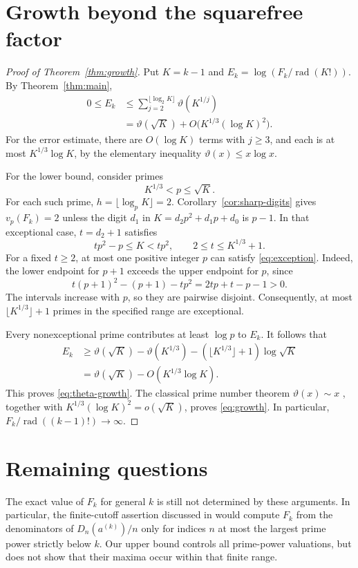 \documentclass[11pt]{article}
\theoremstyle{remark}
\DeclareMathOperator{\rad}{rad}
\begin{document}
\section{Growth beyond the squarefree factor}
\begin{proof}[Proof of Theorem~\ref{thm:growth}]
Put $K=k-1$ and $E_k=\log(F_k/\rad(K!))$. By Theorem~\ref{thm:main},
\begin{align*}
 0\leq E_k
 &\leq\sum_{j=2}^{\lfloor\log_2 K\rfloor}\vartheta(K^{1/j})\\
 &=\vartheta(\sqrt K)+O\bigl(K^{1/3}(\log K)^2\bigr).
\end{align*}
For the error estimate, there are $O(\log K)$ terms with $j\geq3$, and
each is at most $K^{1/3}\log K$, by the elementary inequality
$\vartheta(x)\leq x\log x$.

For the lower bound, consider primes
\[
 K^{1/3}<p\leq\sqrt K.
\]
For each such prime, $h=\lfloor\log_p K\rfloor=2$.
Corollary~\ref{cor:sharp-digits} gives $v_p(F_k)=2$ unless the digit
$d_1$ in $K=d_2p^2+d_1p+d_0$ is $p-1$.
In that exceptional case, $t=d_2+1$ satisfies
\begin{equation}\label{eq:exception}
 tp^2-p\leq K<tp^2,\qquad 2\leq t\leq K^{1/3}+1.
\end{equation}
For a fixed $t\geq2$, at most one positive integer $p$ can satisfy
\eqref{eq:exception}. Indeed, the lower endpoint for $p+1$ exceeds the
upper endpoint for $p$, since
\[
 t(p+1)^2-(p+1)-tp^2=2tp+t-p-1>0.
\]
The intervals increase with $p$, so they are pairwise disjoint.
Consequently, at most $\lfloor K^{1/3}\rfloor+1$ primes in the specified
range are exceptional.

Every nonexceptional prime contributes at least $\log p$ to $E_k$.
It follows that
\begin{align*}
 E_k&\geq\vartheta(\sqrt K)-\vartheta(K^{1/3})
       -(\lfloor K^{1/3}\rfloor+1)\log\sqrt K\\
    &=\vartheta(\sqrt K)-O(K^{1/3}\log K).
\end{align*}
This proves \eqref{eq:theta-growth}. The classical prime number theorem
$\vartheta(x)\sim x$ \cite{Hadamard}, together with
$K^{1/3}(\log K)^2=o(\sqrt K)$, proves \eqref{eq:growth}.
In particular, $F_k/\rad((k-1)!)\to\infty$.
\end{proof}

\section{Remaining questions}
The exact value of $F_k$ for general $k$ is still not determined by these
arguments. In particular, the finite-cutoff assertion discussed in
\cite[Section~4.5]{BGW} would compute $F_k$ from the denominators of
$D_n(a^{(k)})/n$ only for indices $n$ at most the largest prime power
strictly below $k$. Our upper bound controls all prime-power valuations,
but does not show that their maxima occur within that finite range.
\end{document}
